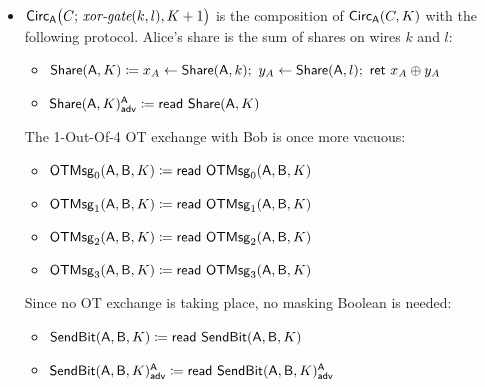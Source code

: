\begin{itemize}
\item $\Circ_\A\big(C; \, \xorgate(k,l),K+1\big)$ is the composition of $\Circ_\A(C,K)$ with the following protocol. Alice's share is the sum of shares on wires $k$ and $l$:
\begin{itemize}
\item $\Share(\A,K) \coloneqq x_A \leftarrow \Share(\A,k); \ y_A \leftarrow \Share(\A,l); \ \ret{x_A \oplus y_A}$
\item {\color{blue} $\LeakShare(\A,K)^\A_\adv \coloneqq \read{\Share(\A,K)}$}
\end{itemize}
The 1-Out-Of-4 OT exchange with Bob is once more vacuous:
\begin{itemize}
\item $\OTMsg_0(\A,\B,K) \coloneqq \read{\OTMsg_0(\A,\B,K)}$
\item $\OTMsg_1(\A,\B,K) \coloneqq \read{\OTMsg_1(\A,\B,K)}$
\item $\OTMsg_2(\A,\B,K) \coloneqq \read{\OTMsg_2(\A,\B,K)}$
\item $\OTMsg_3(\A,\B,K) \coloneqq \read{\OTMsg_3(\A,\B,K)}$
\end{itemize}
Since no OT exchange is taking place, no masking Boolean is needed:
\begin{itemize}
\item $\SendBit(\A,\B,K) \coloneqq \read{\SendBit(\A,\B,K)}$
\item {\color{blue} $\LeakSendBit(\A,\B,K)^\A_\adv \coloneqq \read{\LeakSendBit(\A,\B,K)^\A_\adv}$}
\end{itemize}


\end{itemize}
